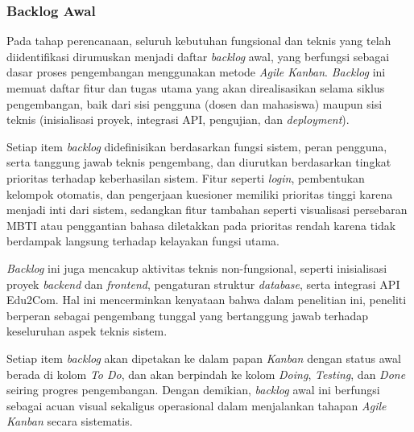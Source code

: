 \subsubsection{Backlog Awal}
Pada tahap perencanaan, seluruh kebutuhan fungsional dan teknis yang telah diidentifikasi dirumuskan menjadi daftar \textit{backlog} awal, yang berfungsi sebagai dasar proses pengembangan menggunakan metode \textit{Agile Kanban}. \textit{Backlog} ini memuat daftar fitur dan tugas utama yang akan direalisasikan selama siklus pengembangan, baik dari sisi pengguna (dosen dan mahasiswa) maupun sisi teknis (inisialisasi proyek, integrasi API, pengujian, dan \textit{deployment}).

Setiap item \textit{backlog} didefinisikan berdasarkan fungsi sistem, peran pengguna, serta tanggung jawab teknis pengembang, dan diurutkan berdasarkan tingkat prioritas terhadap keberhasilan sistem. Fitur seperti \textit{login}, pembentukan kelompok otomatis, dan pengerjaan kuesioner memiliki prioritas tinggi karena menjadi inti dari sistem, sedangkan fitur tambahan seperti visualisasi persebaran MBTI atau penggantian bahasa diletakkan pada prioritas rendah karena tidak berdampak langsung terhadap kelayakan fungsi utama.

\textit{Backlog} ini juga mencakup aktivitas teknis non-fungsional, seperti inisialisasi proyek \textit{backend} dan \textit{frontend}, pengaturan struktur \textit{database}, serta integrasi API Edu2Com. Hal ini mencerminkan kenyataan bahwa dalam penelitian ini, peneliti berperan sebagai pengembang tunggal yang bertanggung jawab terhadap keseluruhan aspek teknis sistem.

Setiap item \textit{backlog} akan dipetakan ke dalam papan \textit{Kanban} dengan status awal berada di kolom \textit{To Do}, dan akan berpindah ke kolom \textit{Doing}, \textit{Testing}, dan \textit{Done} seiring progres pengembangan. Dengan demikian, \textit{backlog} awal ini berfungsi sebagai acuan visual sekaligus operasional dalam menjalankan tahapan \textit{Agile Kanban} secara sistematis.

